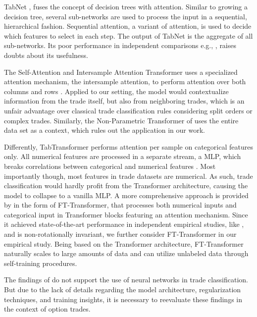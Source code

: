 TabNet \autocite[][3--5]{arikTabnetAttentiveInterpretable2020}, fuses the concept of decision trees with attention. Similar to growing a decision tree, several sub-networks are used to process the input in a sequential, hierarchical fashion. Sequential attention, a variant of attention, is used to decide which features to select in each step. The output of TabNet is the aggregate of all sub-networks. Its poor performance in independent comparisons e.g., \textcites[][23934]{kadraWelltunedSimpleNets2021}[][18398]{gorishniyRevisitingDeepLearning2021}, raises doubts about its usefulness.

The Self-Attention and Intersample Attention Transformer uses a specialized attention mechanism, the intersample attention, to perform attention over both columns and rows \autocite[][4--5]{somepalliSaintImprovedNeural2021}. Applied to our setting, the model would contextualize information from the trade itself, but also from neighboring trades, which is an unfair advantage over classical trade classification rules considering split orders or complex trades. Similarly, the Non-Parametric Transformer of \textcite[][3--4]{kossenSelfAttentionDatapointsGoing2021} uses the entire data set as a context, which rules out the application in our work.

Differently, TabTransformer \autocite[][2--3]{huangTabTransformerTabularData2020} performs attention per sample on categorical features only. All numerical features are processed in a separate stream, a \gls{MLP}, which breaks correlations between categorical and numerical features \autocite[][2]{somepalliSaintImprovedNeural2021}. Most importantly though, most features in trade datasets are numerical. As such, trade classification would hardly profit from the Transformer architecture, causing the model to collapse to a vanilla \gls{MLP}. A more comprehensive approach is provided by \textcite[][18935--18936]{gorishniyRevisitingDeepLearning2021} in the form of FT-Transformer, that processes both numerical inputs and categorical input in Transformer blocks featuring an attention mechanism. Since it achieved state-of-the-art performance in independent empirical studies, like \textcite[][511]{grinsztajnWhyTreebasedModels2022}, and is non-rotationally invariant, we further consider FT-Transformer in our empirical study. Being based on the Transformer architecture, FT-Transformer naturally scales to large amounts of data and can utilize unlabeled data through self-training procedures.

The findings of \textcite[][50]{ronenMachineLearningTrade2022} do not support the use of neural networks in trade classification. But due to the lack of details regarding the model architecture, regularization techniques, and training insights, it is necessary to reevaluate these findings in the context of option trades.

